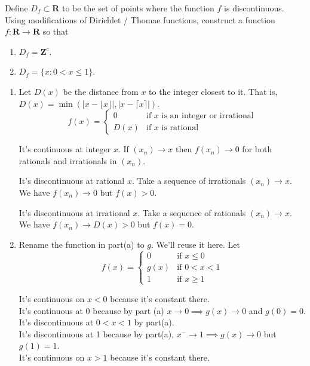 \documentclass{oxmathproblems}
\begin{document}
\begin{questions}

\miquestion Define $D_{f} \subset \textbf{R}$ to be the set of points where the function $f$ is discontinuous. Using modifications of Dirichlet / Thomae functions,
construct a function $f: \textbf{R} \to \textbf{R}$ so that
\begin{enumerate}[label=(\alph*)]
  \item $D_{f} = \textbf{Z}^c$.
  \item $D_{f} = \{x: 0 < x \leq 1\}$.
\end{enumerate}

\begin{solution}
  \begin{enumerate}[label=(\alph*)]
    \item Let $D(x)$ be the distance from $x$ to the integer closest to it. That is, $D(x) = \min(|x - \lfloor x \rfloor|, |x - \lceil x \rceil|)$.
      \[f(x) = 
      \begin{cases}
         0 & \text{if } x \text{ is an integer or irrational} \\
         D(x) & \text{if } x \text{ is rational}
      \end{cases}
     \]

     It's continuous at integer $x$. If $(x_{n}) \to x$ then $f(x_{n}) \to 0$ for both rationals and irrationals in $(x_{n})$.

     It's discontinuous at rational $x$. Take a sequence of irrationals $(x_{n}) \to x$. We have $f(x_{n}) \to 0$ but $f(x) > 0$.

     It's discontinuous at irrational $x$. Take a sequence of rationals $(x_{n}) \to x$. We have $f(x_{n}) \to D(x) > 0$ but $f(x) = 0$.
     
    \item Rename the function in part(a) to $g$. We'll reuse it here. Let
    \[f(x) = 
      \begin{cases}
         0 & \text{if } x \leq 0 \\
         g(x) & \text{if } 0 < x < 1 \\
         1 & \text{if } x \geq 1
      \end{cases}
    \]

    It's continuous on $x < 0$ because it's constant there.\\
    It's continuous at 0 because by part (a) $x \to 0 \implies g(x) \to 0$ and $g(0)=0$.\\
    It's discontinuous at $0 < x < 1$ by part(a).\\
    It's discontinuous at 1 because by part(a), $x^{-} \to 1 \implies g(x) \to 0$ but $g(1)=1$.\\
    It's continuous on $x > 1$ because it's constant there.
  \end{enumerate}
\end{solution}


\end{questions}
\end{document}
